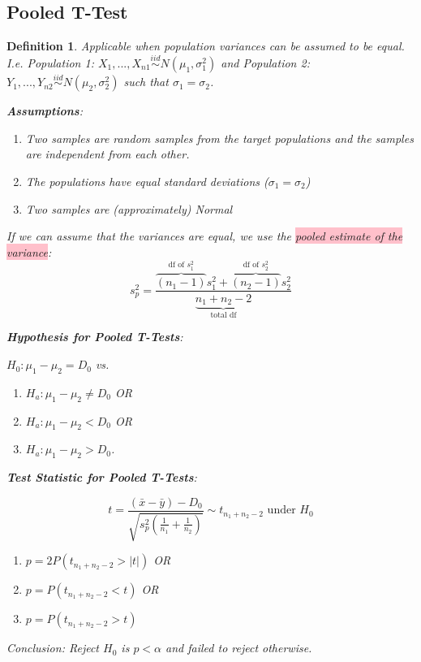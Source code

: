 \documentclass[a4paper,11pt]{article}
\newtheorem{defn}[thm]{Definition}
\begin{document}
\subsection{Pooled T-Test}
\begin{defn}
\normalfont
Applicable when population variances can be assumed to be equal. I.e. Population 1: $X_1,...,X_{n1}\stackrel{iid}{\sim}N(\mu_1, \sigma_1^2)$ and Population 2: $Y_1,...,Y_{n2}\stackrel{iid}{\sim}N(\mu_2,\sigma_2^2)$ such that $\sigma_1=\sigma_2$. 

\textbf{Assumptions}:
\begin{enumerate}
\item Two samples are random samples from the target populations and the samples are independent from each other. 
\item The populations have equal standard deviations ($\sigma_1=\sigma_2$)
\item Two samples are (approximately) Normal
\end{enumerate}
If we can assume that the variances are equal, we use the \colorbox{pink}{pooled estimate of the variance}: 
$$s_p^2=\frac{\overbrace{(n_1-1)}^\text{df of $s_1^2$}s_1^2+\overbrace{(n_2-1)}^\text{df of $s_2^2$}s_2^2}{\underbrace{n_1+n_2-2}_\text{total df}}$$

\textbf{Hypothesis for Pooled T-Tests}: 

$H_0:\mu_1-\mu_2=D_0$ vs. 
\begin{enumerate}
\item $H_a:\mu_1-\mu_2\neq D_0$ OR
\item $H_a:\mu_1-\mu_2<D_0$ OR
\item $H_a:\mu_1-\mu_2>D_0$. 
\end{enumerate}

\textbf{Test Statistic for Pooled T-Tests}:

$$t=\frac{(\bar{x}-\bar{y})-D_0}{\sqrt{s_p^2(\frac{1}{n_1}+\frac{1}{n_2})}}\sim t_{n_1+n_2-2}\text{ under }H_0$$

\begin{enumerate}
\item $p=2P(t_{n_1+n_2-2}>|t|)$ OR
\item $p=P(t_{n_1+n_2-2}<t)$ OR
\item $p=P(t_{n_1+n_2-2}>t)$
\end{enumerate}

Conclusion: Reject $H_0$ is $p<\alpha$ and failed to reject otherwise. 
\end{defn}
\end{document}
